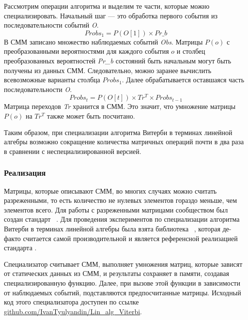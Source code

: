 Рассмотрим операции алгоритма и выделим те части, 
которые можно специализировать.
Начальный шаг --- это обработка первого события из 
последовательности событий \emph{O}.
\[Probs_{1} = P(O[1]) \times Pr\_b\]
В СММ записано множество наблюдаемых событий \emph{Obs}.
Матрицы $P(o)$ с преобразованными вероятностями для каждого 
события $o$ и столбец преобразованных вероятностей 
\emph{Pr\_b} состояний быть начальным могут быть 
получены из данных СММ.
Следовательно, можно заранее вычислить всевозможные варианты 
столбца $Probs_{1}$. 
Далее обрабатывается оставшаяся часть последовательности 
\emph{O}.
\[Probs_{t} = P(O[t]) \times Tr^{T} \times Probs_{t - 1}\]
Матрица переходов \emph{Tr} хранится в СММ.
Это значит, что умножение матрицы $P(o)$ на $Tr^{T}$ также 
может быть посчитано.

Таким образом, при специализации алгоритма Витерби в 
терминах линейной алгебры возможно сокращение количества 
матричных операций почти в два раза в сравнении с 
неспециализированной версией.

\subsubsection{Реализация}
Матрицы, которые описывают СММ, во многих случаях можно 
считать разреженными, то есть количество не нулевых элементов 
гораздо меньше, чем элементов всего.
Для работы с разреженными матрицами сообществом был создан 
стандарт ~\cite{GraphBLAS}.
Для проведения экспериментов по специализации алгоритма 
Витерби в терминах линейной алгебры была взята библиотека 
~\cite{SuiteSparse}, 
которая де-факто считается самой производительной и является 
референсной реализацией стандарта .

Специализатор считывает СММ, выполняет умножения матриц, 
которые зависят от статических данных из СММ, и результаты 
сохраняет в памяти, создавая специализированную функцию.
Далее, при вызове этой функции в зависимости от наблюдаемых 
событий, подставляются предпосчитанные матрицы.
Исходный код этого специализатора доступен по ссылке 
\href{https://github.com/IvanTyulyandin/Lin_alg_Viterbi}
{github.com/IvanTyulyandin/Lin\_alg\_Viterbi}.